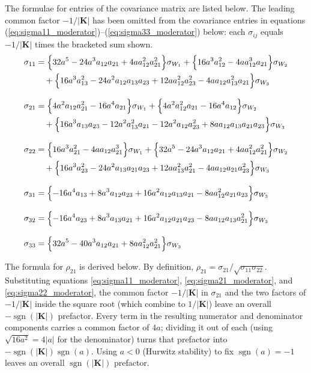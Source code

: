 \documentclass{article}
\begin{document}
The formulae for entries of the covariance matrix are listed below.
The leading common factor $-1/|\mathbf{K}|$ has been omitted from the
covariance entries in equations
(\ref{eq:sigma11_moderator})--(\ref{eq:sigma33_moderator}) below: each
$\sigma_{ij}$ equals $-1/|\mathbf{K}|$ times the bracketed sum shown.
\begin{align}
\sigma_{11}&= \Bigl\{ 32a^5-24a^3a_{12}a_{21}+4aa_{12}^2a_{21}^2 \Bigr\} \sigma_{W_{1}}
+ \Bigl\{ 16a^3a_{12}^2-4aa_{12}^3a_{21} \Bigr\} \sigma_{W_{2}} \nonumber \\
&\quad + \Bigl\{ 16a^3a_{13}^2-24a^2a_{12}a_{13}a_{23}+12aa_{12}^2a_{23}^2-4aa_{12}a_{13}^2a_{21} \Bigr\} \sigma_{W_{3}} \label{eq:sigma11_moderator} \\[8pt]
\sigma_{21}&= \Bigl\{ 4a^2a_{12}a_{21}^2-16a^4a_{21} \Bigr\} \sigma_{W_{1}}
+ \Bigl\{ 4a^2a_{12}^2a_{21}-16a^4a_{12} \Bigr\} \sigma_{W_{2}} \nonumber \\
&\quad + \Bigl\{ 16a^3a_{13}a_{23}-12a^2a_{13}^2a_{21}-12a^2a_{12}a_{23}^2+8aa_{12}a_{13}a_{21}a_{23} \Bigr\} \sigma_{W_{3}} \label{eq:sigma21_moderator} \\[8pt]
\sigma_{22}&= \Bigl\{ 16a^3a_{21}^2-4aa_{12}a_{21}^3 \Bigr\} \sigma_{W_{1}}
+ \Bigl\{ 32a^5-24a^3a_{12}a_{21}+4aa_{12}^2a_{21}^2 \Bigr\} \sigma_{W_{2}} \nonumber \\
&\quad + \Bigl\{ 16a^3a_{23}^2-24a^2a_{13}a_{21}a_{23}+12aa_{13}^2a_{21}^2-4aa_{12}a_{21}a_{23}^2 \Bigr\} \sigma_{W_{3}} \label{eq:sigma22_moderator} \\[8pt]
\sigma_{31}&= \Bigl\{ -16a^4a_{13}+8a^3a_{12}a_{23}+16a^2a_{12}a_{13}a_{21}-8aa_{12}^2a_{21}a_{23} \Bigr\} \sigma_{W_{3}} \label{eq:sigma31_moderator} \\[8pt]
\sigma_{32}&= \Bigl\{ -16a^4a_{23}+8a^3a_{13}a_{21}+16a^2a_{12}a_{21}a_{23}-8aa_{12}a_{13}a_{21}^2 \Bigr\} \sigma_{W_{3}} \label{eq:sigma32_moderator} \\[8pt]
\sigma_{33}&= \Bigl\{ 32a^5-40a^3a_{12}a_{21}+8aa_{12}^2a_{21}^2 \Bigr\} \sigma_{W_{3}} \label{eq:sigma33_moderator}
\end{align}

The formula for $\rho_{21}$ is derived below. By definition,
$\rho_{21}=\sigma_{21}/\sqrt{\sigma_{11}\sigma_{22}}$. Substituting equations
\ref{eq:sigma11_moderator}, \ref{eq:sigma21_moderator}, and \ref{eq:sigma22_moderator},
the common factor $-1/|\mathbf{K}|$ in $\sigma_{21}$ and the two factors of $-1/|\mathbf{K}|$
inside the square root (which combine to $1/|\mathbf{K}|$) leave an overall
$-\operatorname{sgn}(|\mathbf{K}|)$ prefactor. Every term in the resulting numerator and
denominator components carries a common factor of $4a$; dividing it out of each (using
$\sqrt{16a^2}=4|a|$ for the denominator) turns that prefactor into
$-\operatorname{sgn}(|\mathbf{K}|)\operatorname{sgn}(a)$. Using $a<0$ (Hurwitz stability) to fix
$\operatorname{sgn}(a)=-1$ leaves an overall $\operatorname{sgn}(|\mathbf{K}|)$ prefactor.
\end{document}
